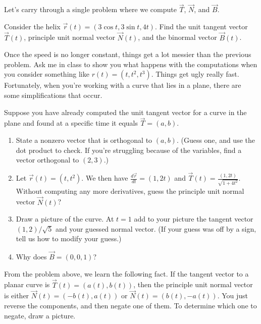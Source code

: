 Let's carry through a single problem where we compute $\vec T$, $\vec N$, and $\vec B$. 

\begin{problem} \label{helix example of T N and B}
%
Consider the helix $\vec r(t) = (3\cos t,3\sin t, 4t)$.  Find the unit tangent vector $\vec T(t)$, principle unit normal vector $\vec N(t)$, and the binormal vector $\vec B(t)$. 
\end{problem}

Once the speed is no longer constant, things get a lot messier than the previous problem. Ask me in class to show you what happens with the computations when you consider something like $r(t)=(t,t^2,t^3)$. Things get ugly really fast. Fortunately, when you're working with a curve that lies in a plane, there are some simplifications that occur.

\begin{problem}
%
 Suppose you have already computed the unit tangent vector for a curve in the plane and found at a specific time it equals $\vec T=(a,b)$.   
\begin{enumerate}
 \item State a nonzero vector that is orthogonal to $(a,b)$. (Guess one, and use the dot product to check. If you're struggling because of the variables, find a vector orthogonal to $(2,3)$.)
 \item Let $\vec r(t) = (t,t^2)$. We then have $\frac{d\vec r}{dt} = (1,2t)$ and $\vec T(t) = \frac{(1,2t)}{\sqrt{1+4t^2}}$. Without computing any more derivatives, guess the principle unit normal vector $\vec N(t)$?
 \item Draw a picture of the curve. At $t=1$ add to your picture the tangent vector $(1,2)/\sqrt{5}$ and your guessed normal vector. (If your guess was off by a sign, tell us how to modify your guess.)
 \item Why does $\vec B=(0,0,1)$?
\end{enumerate}
\end{problem}

\begin{observation}
From the problem above, we learn the following fact.  If the tangent vector to a planar curve is $\vec T(t) = (a(t),b(t))$, then the principle unit normal vector is either $\vec N(t)=(-b(t),a(t))$ or $\vec N(t)=(b(t),-a(t))$.  You just reverse the components, and then negate one of them.  To determine which one to negate, draw a picture.
\end{observation}

